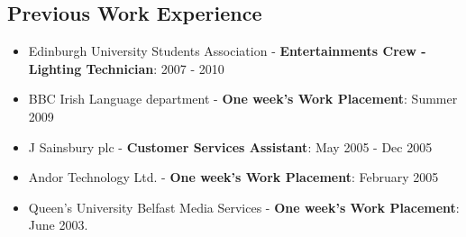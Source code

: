 \documentclass[a4paper]{article}
\begin{document}
\subsection*{Previous Work Experience}
\begin{itemize}

\item Edinburgh University Students Association - {\bf Entertainments Crew - Lighting Technician}: 2007 - 2010
\item BBC Irish Language department - {\bf One week's Work Placement}: Summer 2009
\item J Sainsbury plc - {\bf Customer Services Assistant}: May 2005 - Dec 2005
\item Andor Technology Ltd. - {\bf One week's Work Placement}:  February 2005
\item Queen's University Belfast Media Services - {\bf One week's Work Placement}:  June 2003.


\end{itemize}
\end{document}
